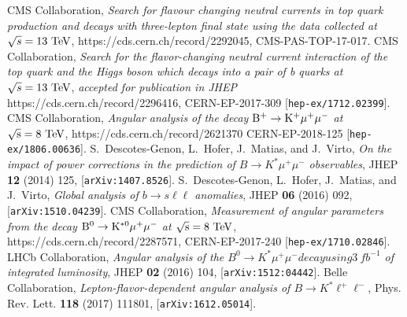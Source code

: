 \documentclass{PoS}
\begin{document}
\begin{thebibliography}{99}

  CMS Collaboration,
  \emph{Search for flavour changing neutral currents in top quark production and decays with three-lepton final state using the data collected at $\sqrt{s} = 13~{\rm TeV}$},
  https://cds.cern.ch/record/2292045, CMS-PAS-TOP-17-017.
  CMS Collaboration,
  \emph{Search for the flavor-changing neutral current interaction of the top quark and the Higgs boson which decays into a pair of b quarks at $\sqrt{s} = 13~{\rm TeV}$},
  \emph{accepted for publication in JHEP}
  https://cds.cern.ch/record/2296416, CERN-EP-2017-309
  [{\tt hep-ex/1712.02399}].
  CMS Collaboration,
  \emph{Angular analysis of the decay ${\rm B^+ \to K^+\mu^+\mu^-}$ at ${\rm \sqrt{s} = 8~TeV}$},
  https://cds.cern.ch/record/2621370 CERN-EP-2018-125
  [{\tt hep-ex/1806.00636}].
  S.~Descotes-Genon, L.~Hofer, J.~Matias, and J.~Virto,
  \emph{On the impact of power corrections in the prediction of $B \to K^*\mu^+\mu^-$ observables},
  JHEP {\bf 12} (2014) 125, [{\tt arXiv:1407.8526}].
  S.~Descotes-Genon, L.~Hofer, J.~Matias, and J.~Virto,
  \emph{Global analysis of $b \to s\ell\ell$ anomalies},
  JHEP {\bf 06} (2016) 092, [{\tt arXiv:1510.04239}].
  CMS Collaboration,
  \emph{Measurement of angular parameters from the decay ${\rm B^0 \to K^{*0}\mu^+\mu^-}$ at ${\rm \sqrt{s} = 8~TeV}$},
  https://cds.cern.ch/record/2287571, CERN-EP-2017-240
  [{\tt hep-ex/1710.02846}].  
  LHCb Collaboration,
  \emph{Angular analysis of the $B^0 \to K^*\mu^+\mu^- decay using 3~fb^{-1}$ of integrated luminosity},
  JHEP {\bf 02} (2016) 104, [{\tt arXiv:1512:04442}].
  Belle Collaboration,
  \emph{Lepton-flavor-dependent angular analysis of $B \to K^* \ell^+\ell^-$},
  Phys. Rev. Lett. {\bf 118} (2017) 111801, [{\tt arXiv:1612.05014}].
\end{thebibliography}
\end{document}
